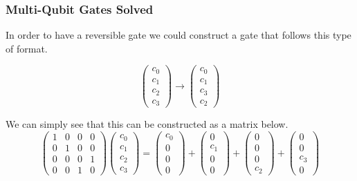 \documentclass{beamer}
\begin{document}
\begin{frame}
\frametitle{Multi-Qubit Gates Solved}

In order to have a reversible gate we could construct a gate that follows this type of format.

\[
    \begin{pmatrix}
        c_0 \\
        c_1 \\
        c_2 \\
        c_3
    \end{pmatrix}
    \xrightarrow{}
    \begin{pmatrix}
        c_0 \\
        c_1 \\
        c_3 \\
        c_2
    \end{pmatrix}
\]

We can simply see that this can be constructed as a matrix below.
\[
  \begin{pmatrix}
      1 & 0 & 0 & 0 \\
      0 & 1 & 0 & 0 \\
      0 & 0 & 0 & 1 \\
      0 & 0 & 1 & 0 
  \end{pmatrix}
  \begin{pmatrix}
      c_0 \\
      c_1 \\
      c_2 \\
      c_3
  \end{pmatrix}
  =
  \begin{pmatrix}
      c_0 \\
      0 \\
      0 \\
      0
  \end{pmatrix}
  +
  \begin{pmatrix}
      0 \\
      c_1 \\
      0 \\
      0
  \end{pmatrix}
  +
  \begin{pmatrix}
      0 \\
      0 \\
      0 \\
      c_2
  \end{pmatrix}
  +
  \begin{pmatrix}
      0 \\
      0 \\
      c_3 \\
      0
  \end{pmatrix}
\]

\end{frame}
\end{document}
